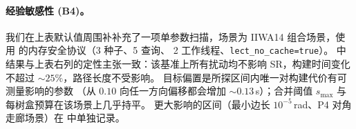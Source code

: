 \documentclass[journal]{IEEEtran}
\begin{document}
\paragraph{经验敏感性 (B4)。}
我们在上表默认值周围补补充了一项单参数扫描，场景为 IIWA14
组合场景，使用  的内存安全协议（3 种子、5 查询、
2 工作线程、\texttt{lect\_no\_cache=true}）。
 中结果与上表右列的定性主张一致：该基准上所有扰动均不影响 SR，构建时间变化不超过 $\sim 25\%$，路径长度不受影响。
目标偏置是所探区间内唯一对构建代价有可测量影响的参数
（从 $0.10$ 向任一方向偏移都会增加 $\sim 0.13$\,s）；合并阈值 $s_{\max}$
与每树盒预算在该场景上几乎持平。
更大影响的区间（最小边长 $10^{-5}$\,rad、P4 对角走廊场景）在
 中单独记录。


\end{document}
